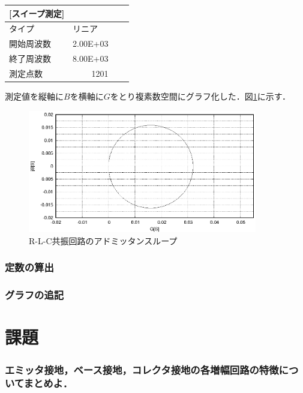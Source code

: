 \documentclass[dvipdfmx,titlepage,a4j]{jsarticle}  %
\numberwithin{equation}{section}
\begin{document}
\begin{table}[H]
\begin{center}
\begin{tabular}{l|l|l|l}
      [スイープ測定] &                               &                &                              \\ \hline
      タイプ         & リニア                        &                &                              \\ \hline
      開始周波数     & \multicolumn{1}{r|}{2.00E+03} &                &                              \\ \hline
      終了周波数     & \multicolumn{1}{r|}{8.00E+03} &                &                              \\ \hline
      測定点数       & \multicolumn{1}{r|}{1201}     &                &                              \\ \hline
    \end{tabular}
  \end{center}
  \label{tbl:lcrm-admitance-loop}
\end{table}

測定値を縦軸に$B$を横軸に$G$をとり複素数空間にグラフ化した．図\ref{fig:A_GB.eps}に示す．
\begin{figure}[H]
  \centering
  \includegraphics[width=10cm]{../gnuplot/A_GB.eps}
  \caption{R-L-C共振回路のアドミッタンスループ}
  \label{fig:A_GB.eps}
\end{figure}

\subsubsection{定数の算出}

\subsubsection{グラフの追記}

\section{課題}

\subsubsection{エミッタ接地，ベース接地，コレクタ接地の各増幅回路の特徴についてまとめよ．}
\end{document}
